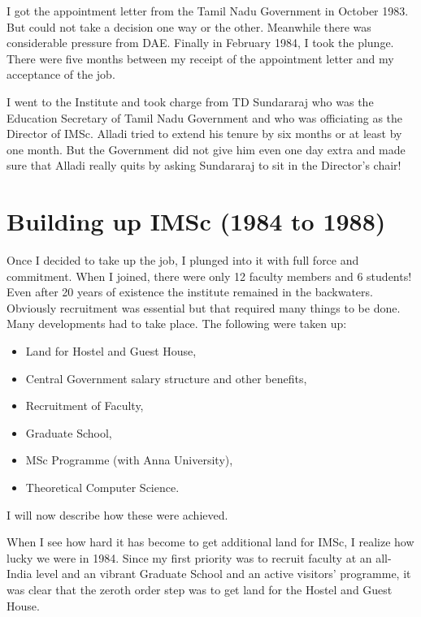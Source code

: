 I got the appointment letter from the Tamil Nadu Government in October 
1983. But could not take a decision one way or the other. Meanwhile 
there was considerable pressure from DAE. Finally in February 1984, I 
took the plunge. There were five months between my receipt of the 
appointment letter and my acceptance of the job.

I went to the Institute and took charge from TD Sundararaj who was the 
Education Secretary of Tamil Nadu Government and who was officiating as 
the Director of IMSc. Alladi tried to extend his tenure by six months or 
at least by one month. But the Government did not give him even one day 
extra and made sure that Alladi really quits by asking Sundararaj to sit 
in the Director's chair!
 

\section*{Building up IMSc (1984 to 1988)}

Once I decided to take up the job, I plunged into it with full force and 
commitment. When I joined, there were only 12 faculty members and 6 
students! Even after 20 years of existence the institute remained in the 
backwaters. Obviously recruitment was essential but that required many 
things to be done. Many developments had to take place. The following 
were taken up:
\begin{itemize}
\item Land for Hostel and Guest House, 
\item Central Government salary structure and other benefits, 
\item Recruitment of Faculty, 
\item Graduate School, 
\item MSc Programme (with Anna University), 
\item Theoretical Computer Science.
\end{itemize}

I will now describe how these were achieved. 

When I see how hard it has become to get additional land for IMSc, I 
realize how lucky we were in 1984. Since my first priority was to 
recruit faculty at an all-India level and an vibrant Graduate School and 
an active visitors' programme, it was clear that the zeroth order step 
was to get land for the Hostel and Guest House.

